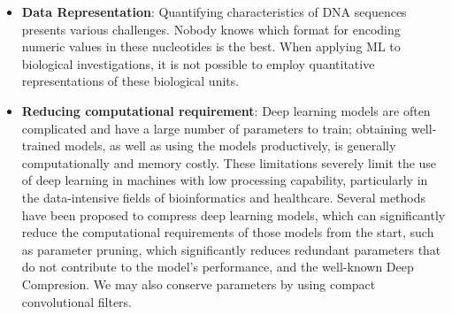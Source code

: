 \begin{itemize}
    \item \textbf{Data Representation}: Quantifying characteristics of DNA sequences presents various challenges. Nobody knows which format for encoding numeric values in these nucleotides is the best. When applying \gls{ML} to biological investigations, it is not possible to employ quantitative representations of these biological units.
    
    \item \textbf{Reducing computational requirement}: Deep learning models are often complicated and have a large number of parameters to train; obtaining well-trained models, as well as using the models productively, is generally computationally and memory costly. These limitations severely limit the use of deep learning in machines with low processing capability, particularly in the data-intensive fields of bioinformatics and healthcare. Several methods have been proposed to compress deep learning models, which can significantly reduce the computational requirements of those models from the start, such as parameter pruning, which significantly reduces redundant parameters that do not contribute to the model's performance, and the well-known Deep Compresion. We may also conserve parameters by using compact convolutional filters.
\end{itemize}